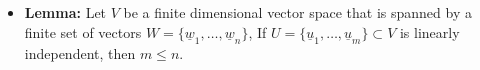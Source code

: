 \documentclass[11pt,twoside]{report}
\newcommand{\vecnot}{\underline}
\newcommand{\Span}{\mathrm{span}}
\begin{document}
\begin{itemize}
\begin{itemize}
%
%
%
%
\end{itemize}



\item \textbf{Lemma:} Let $V$ be a finite dimensional vector space that is spanned by a finite set of vectors  $W = \{ \vecnot{w}_1, \dots , \vecnot{w}_n\}$, 
If $U= \{\vecnot{u}_1, \dots, \vecnot{u}_m\} \subset V$ is linearly independent, then $m \le n$. 


\end{itemize}
\end{document}
